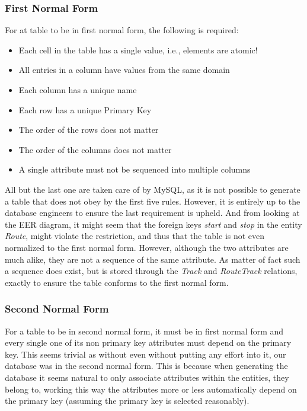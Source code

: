 \subsubsection{First Normal Form}
For at table to be in first normal form, the following is required:
\begin{itemize}
    \item Each cell in the table has a single value, i.e., elements are atomic!
    \item All entries in a column have values from the same domain
    \item Each column has a unique name
    \item Each row has a unique Primary Key
    \item The order of the rows does not matter
    \item The order of the columns does not matter
    \item A single attribute must not be sequenced into multiple columns
\end{itemize}
All but the last one are taken care of by MySQL, as it is not possible to 
generate a table that does not obey by the first five rules. However, it is 
entirely up to the database engineers to ensure the last requirement is upheld. 
And from looking at the EER diagram, it might seem that the foreign keys 
\emph{start} and \emph{stop} in the entity \emph{Route}, might violate the 
restriction, and thus that the table is not even normalized to the first normal 
form. However, although the two attributes are much alike, they are not a 
sequence of the same attribute. As matter of fact such a sequence does exist, 
but is stored through the \emph{Track} and \emph{RouteTrack} relations, exactly 
to ensure the table conforms to the first normal form. 

\subsubsection{Second Normal Form}
For a table to be in second normal form, it must be in first normal form and 
every single one of its non primary key attributes must depend on the primary 
key. This seems trivial as without even without putting any effort into it, our 
database was in the second normal form. This is because when generating the 
database it seems natural to only associate attributes within the entities, 
they belong to, working this way the attributes more or less automatically 
depend on the primary key (assuming the primary key is selected reasonably). 


